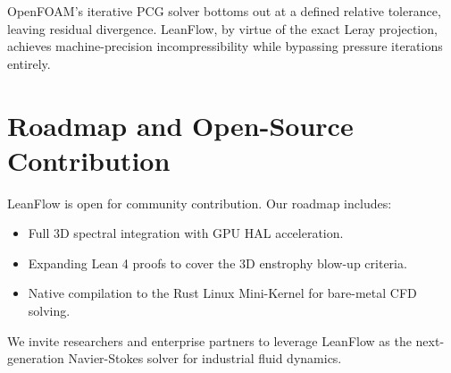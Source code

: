 \documentclass[11pt,a4paper]{article}
\begin{document}
OpenFOAM's iterative PCG solver bottoms out at a defined relative tolerance, leaving residual divergence. LeanFlow, by virtue of the exact Leray projection, achieves machine-precision incompressibility while bypassing pressure iterations entirely.

\section{Roadmap and Open-Source Contribution}
LeanFlow is open for community contribution. Our roadmap includes:
\begin{itemize}
    \item Full 3D spectral integration with GPU HAL acceleration.
    \item Expanding Lean 4 proofs to cover the 3D enstrophy blow-up criteria.
    \item Native compilation to the Rust Linux Mini-Kernel for bare-metal CFD solving.
\end{itemize}
We invite researchers and enterprise partners to leverage LeanFlow as the next-generation Navier-Stokes solver for industrial fluid dynamics.
\end{document}
